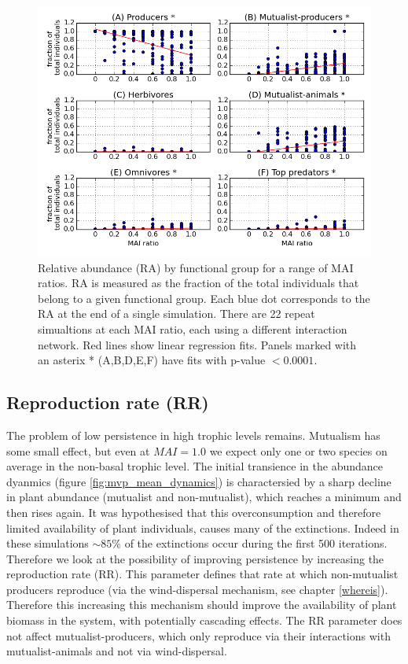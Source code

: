 \begin{figure}
	\centering
	\includegraphics[width=0.8\linewidth]{"figures/proportion_per_functional_group"}
	\caption{Relative abundance (RA) by functional group for a range of MAI ratios. RA is measured as the fraction of the total individuals that belong to a given functional group. Each blue dot corresponds to the RA at the end of a single simulation. There are 22 repeat simualtions at each MAI ratio, each using a different interaction network. Red lines show linear regression fits. Panels marked with an asterix * (A,B,D,E,F) have fits with p-value $< 0.0001$.}
	\label{fig:mvp_prop_per_fg}
\end{figure}

\newpage
\subsection{Reproduction rate (RR)}
\label{sec:rr_v_p}

The problem of low persistence in high trophic levels remains. Mutualism has some small effect, but even at $MAI = 1.0$ we expect only one or two species on average in the non-basal trophic level. The initial transience in the abundance dyanmics (figure \ref{fig:mvp_mean_dynamics}) is charactersied by a sharp decline in plant abundance (mutualist and non-mutualist), which reaches a minimum and then rises again. It was hypothesised that this overconsumption and therefore limited availability of plant individuals, causes many of the extinctions. Indeed in these simulations $\sim 85\%$ of the extinctions occur during the first 500 iterations. Therefore we look at the possibility of improving persistence by increasing the reproduction rate (RR). This parameter defines that rate at which non-mutualist producers reproduce (via the wind-dispersal mechanism, see chapter \ref{whereis}). Therefore this increasing this mechanism should improve the availability of plant biomass in the system, with potentially cascading effects. The RR parameter does not affect mutualist-producers, which only reproduce via their interactions with mutualist-animals and not via wind-dispersal.

